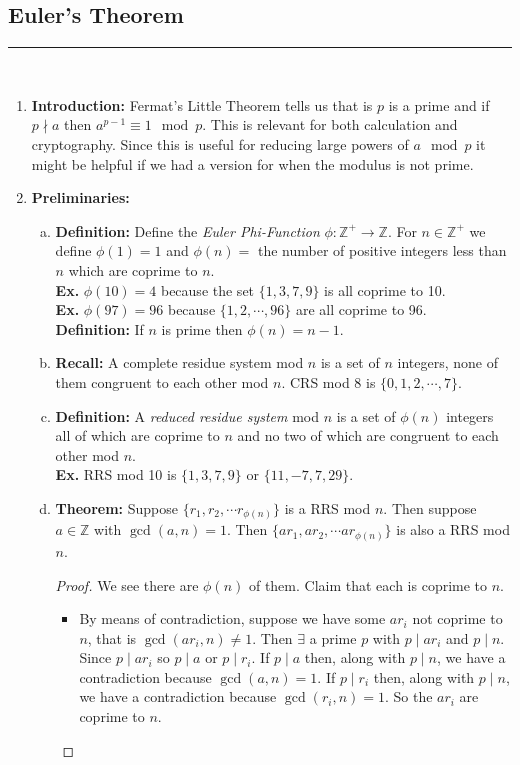 \documentclass[class=article, crop=false]{standalone}
\def\integers{{\mathbb Z}}
\begin{document}
\subsection{Euler's Theorem}
\rule{\textwidth}{1pt}\\
\begin{enumerate}[1.]
	\item \textbf{Introduction:}
	Fermat's Little Theorem tells us that is $p$ is a prime and if $p\nmid a$ then
	$a^{p-1}\equiv 1\mod p$. This is relevant for both calculation and cryptography.
	Since this is useful for reducing large powers of $a\mod p$
	it might be helpful if we had a version for when the modulus is not prime.

	\item \textbf{Preliminaries:}
	\begin{enumerate}[(a)]
		\item \textbf{Definition:} Define the \emph{Euler Phi-Function}
		$\phi: \integers^+ \rightarrow \integers$. For $n\in\integers^+$ we define
		$\phi(1)=1$ and $\phi(n)=$ the number of positive integers less than $n$ which are coprime
		to $n$.\\
		\textbf{Ex.} $\phi(10)=4$ because the set $\{1,3,7,9\}$ is all coprime to 10. \\
		\textbf{Ex.} $\phi(97)=96$ because $\{1,2,\cdots,96\}$ are all coprime to 96. \\
		\textbf{Definition:} If $n$ is prime then $\phi(n)=n-1$.

		\item \textbf{Recall:} A complete residue system mod $n$ is a set of $n$ integers,
		none of them congruent to each other mod $n$. CRS mod 8 is $\{0,1,2,\cdots,7\}$.
		
		
		\item \textbf{Definition:} A \emph{reduced residue system} mod $n$ is a set of
		$\phi(n)$ integers all of which are coprime to $n$ and no two of which are congruent to each
		other mod $n$.\\
		\textbf{Ex.} RRS mod 10 is $\{1,3,7,9\}$ or $\{11,-7,7,29\}$.
		
		\item \textbf{Theorem:} Suppose $\{r_1, r_2,\cdots r_{\phi(n)}\}$ is a RRS mod $n$.
		Then suppose $a\in\integers$ with $\gcd(a,n)=1$. Then
		$\{ar_1, ar_2, \cdots ar_{\phi(n)}\}$ is also a RRS mod $n$.
		\begin{proof}
			We see there are $\phi(n)$ of them. Claim that each is coprime to $n$.
			\begin{itemize}
			\item By means of contradiction, suppose we have some $ar_i$ not coprime to $n$, 
			that is $\gcd(ar_i,n)\neq 1$. Then $\exists $ a prime $p$ with
			$p\mid ar_i$ and $p\mid n$. Since $p\mid ar_i$ so $p\mid a$ or $p\mid r_i$.
			If $p\mid a$ then, along with $p\mid n$, we have a contradiction because
			$\gcd(a,n)=1$. If $p\mid r_i$ then, along with $p\mid n$, we have a contradiction
			because $\gcd(r_i,n)=1$. So the $ar_i$ are coprime to $n$.


\end{itemize}
\end{proof}
\end{enumerate}
\end{enumerate}
\end{document}
